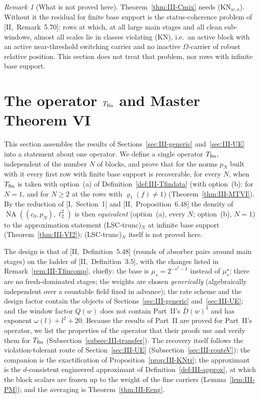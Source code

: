 \documentclass[10pt]{amsart}
\theoremstyle{definition}
\theoremstyle{remark}
\newtheorem{remark}[theorem]{Remark}
\newcommand{\NA}{\operatorname{NA}}
\begin{document}
\begin{remark}[What is not proved here]\label{rem:III-open}
Theorem~\ref{thm:III-Cmix} needs (KN$_{w,a}$).  Without it the residual for finite
base support is the status-coherence problem of [II,~Remark~5.70]: rows at which,
at all large main stages and all clean sub-windows, almost all scales lie in
classes violating (KN), i.e.\ an active block with an active near-threshold
switching carrier and no inactive $\Omega$-carrier of robust relative position.
This section does not treat that problem, nor rows with infinite base support.
\end{remark}
\section{The operator $T_{\rm fin}$ and Master Theorem VI}\label{sec:III-MTVI}

This section assembles the results of Sections~\ref{sec:III-generic}
and~\ref{sec:III-UE} into a statement about one operator.  We define a single
operator $T_{\rm fin}$, independent of the number $N$ of blocks, and prove
that for the norms $p_N$ built with it every first row with finite base
support is recoverable, for every $N$, when $T_{\rm fin}$ is taken with
option~(a) of Definition~\ref{def:III-Tfindata} (with option~(b): for $N=1$,
and for $N\ge2$ at the rows with $\varrho_1(f)\ne1$)
(Theorem~\ref{thm:III-MTVI}).  By the reduction of [I,~Section~1] and
[II,~Proposition~6.48] the density of $\NA((c_0,p_N),\ell_2^2)$ is then
\emph{equivalent} (option~(a), every $N$; option~(b), $N=1$) to the approximation
statement (LSC-trunc)$_N$ at infinite base support
(Theorem~\ref{thm:III-VI2}); (LSC-trunc)$_N$ itself is not proved here.

The design is that of [II,~Definition~5.48] (rounds of absorber pairs around
main stages) on the ladder of [II,~Definition~3.5], with the changes listed
in Remark~\ref{rem:III-Tfincomp}, chiefly: the base is $\mu_s=2^{-s^2-1}$
instead of $\mu^\star_s$; there are no fresh-dominated stages; the weights
are chosen \emph{generically} (algebraically independent over a countable
field fixed in advance); the rate scheme and the design factor contain the
objects of Sections~\ref{sec:III-generic} and~\ref{sec:III-UE}; and the
window factor $Q(w)$ does not contain Part~II's $\bar D(w)^3$ and has
exponent $\omega(l)+l^2+20$.  Because the results of
Part~II are proved for Part~II's operator, we list the properties of the
operator that their proofs use and verify them for $T_{\rm fin}$
(Subsection~\ref{subsec:III-transfer}).  The recovery itself follows the
violation-tolerant route of Section~\ref{sec:III-UE}
(Subsection~\ref{sec:III-routeV}): the companion is the exactification of
Proposition~\ref{prop:III-KNtr}; the approximant is the $d$-consistent
engineered approximant of Definition~\ref{def:III-approx}, at which the block
scalars are frozen up to the weight of the fine carriers
(Lemma~\ref{lem:III-PM}); and the averaging is
Theorem~\ref{thm:III-Eeng}.
\end{document}
